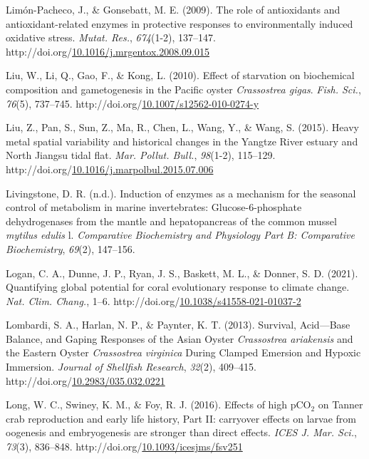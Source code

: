 \documentclass [11pt, proquest] {uwthesis}[2015/03/03]
\newlength{\cslhangindent}
\newenvironment{CSLReferences}%
{\setlength{\parindent}{0pt}%
\everypar{\setlength{\hangindent}{\cslhangindent}}\ignorespaces}%
{\par}
\begin{document}
\begin{CSLReferences}{1}{0}
\leavevmode\hypertarget{ref-Limon-Pacheco2009}{}%
Limón-Pacheco, J., \& Gonsebatt, M. E. (2009). {The role of antioxidants and antioxidant-related enzymes in protective responses to environmentally induced oxidative stress}. \emph{Mutat. Res.}, \emph{674}(1-2), 137--147. http://doi.org/\href{https://doi.org/10.1016/j.mrgentox.2008.09.015}{10.1016/j.mrgentox.2008.09.015}

\leavevmode\hypertarget{ref-Liu2010}{}%
Liu, W., Li, Q., Gao, F., \& Kong, L. (2010). {Effect of starvation on biochemical composition and gametogenesis in the Pacific oyster \emph{Crassostrea gigas}}. \emph{Fish. Sci.}, \emph{76}(5), 737--745. http://doi.org/\href{https://doi.org/10.1007/s12562-010-0274-y}{10.1007/s12562-010-0274-y}

\leavevmode\hypertarget{ref-Liu2015}{}%
Liu, Z., Pan, S., Sun, Z., Ma, R., Chen, L., Wang, Y., \& Wang, S. (2015). {Heavy metal spatial variability and historical changes in the Yangtze River estuary and North Jiangsu tidal flat}. \emph{Mar. Pollut. Bull.}, \emph{98}(1-2), 115--129. http://doi.org/\href{https://doi.org/10.1016/j.marpolbul.2015.07.006}{10.1016/j.marpolbul.2015.07.006}

\leavevmode\hypertarget{ref-Livingstone1981}{}%
Livingstone, D. R. (n.d.). Induction of enzymes as a mechanism for the seasonal control of metabolism in marine invertebrates: Glucose-6-phosphate dehydrogenases from the mantle and hepatopancreas of the common mussel \emph{mytilus edulis} l. \emph{Comparative Biochemistry and Physiology Part B: Comparative Biochemistry}, \emph{69}(2), 147--156.

\leavevmode\hypertarget{ref-Logan2021}{}%
Logan, C. A., Dunne, J. P., Ryan, J. S., Baskett, M. L., \& Donner, S. D. (2021). {Quantifying global potential for coral evolutionary response to climate change}. \emph{Nat. Clim. Chang.}, 1--6. http://doi.org/\href{https://doi.org/10.1038/s41558-021-01037-2}{10.1038/s41558-021-01037-2}

\leavevmode\hypertarget{ref-Lombardi2013}{}%
Lombardi, S. A., Harlan, N. P., \& Paynter, K. T. (2013). {Survival, Acid---Base Balance, and Gaping Responses of the Asian Oyster \emph{Crassostrea ariakensis} and the Eastern Oyster \emph{Crassostrea virginica} During Clamped Emersion and Hypoxic Immersion}. \emph{Journal of Shellfish Research}, \emph{32}(2), 409--415. http://doi.org/\href{https://doi.org/10.2983/035.032.0221}{10.2983/035.032.0221}

\leavevmode\hypertarget{ref-Long2016}{}%
Long, W. C., Swiney, K. M., \& Foy, R. J. (2016). {Effects of high {pCO\(_2\)} on Tanner crab reproduction and early life history, Part II: carryover effects on larvae from oogenesis and embryogenesis are stronger than direct effects}. \emph{ICES J. Mar. Sci.}, \emph{73}(3), 836--848. http://doi.org/\href{https://doi.org/10.1093/icesjms/fsv251}{10.1093/icesjms/fsv251}


\end{CSLReferences}
\end{document}
